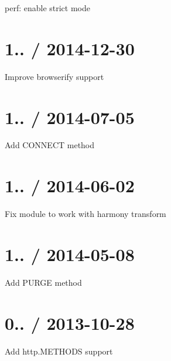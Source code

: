 
\begin{DoxyItemize}
\item perf\+: enable strict mode
\end{DoxyItemize}

\section*{1.. / 2014-\/12-\/30 }


\begin{DoxyItemize}
\item Improve {\ttfamily browserify} support
\end{DoxyItemize}

\section*{1.. / 2014-\/07-\/05 }


\begin{DoxyItemize}
\item Add {\ttfamily C\+O\+N\+N\+E\+CT} method
\end{DoxyItemize}

\section*{1.. / 2014-\/06-\/02 }


\begin{DoxyItemize}
\item Fix module to work with harmony transform
\end{DoxyItemize}

\section*{1.. / 2014-\/05-\/08 }


\begin{DoxyItemize}
\item Add {\ttfamily P\+U\+R\+GE} method
\end{DoxyItemize}

\section*{0.. / 2013-\/10-\/28 }


\begin{DoxyItemize}
\item Add {\ttfamily http.\+M\+E\+T\+H\+O\+DS} support 
\end{DoxyItemize}